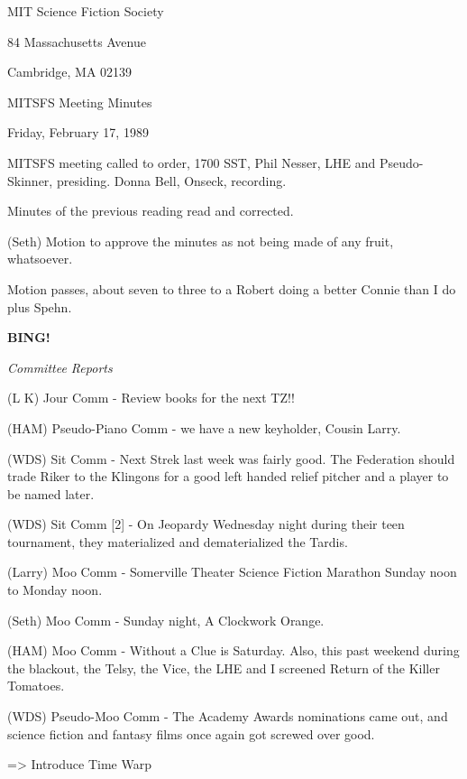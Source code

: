 \documentclass[12pt]{article}
\newcommand{\bing}{{\bf BING!} }
\newcommand{\goto}[1]{\bing \vskip 12pt \centerline{{\em{#1}}}}
\begin{document}
\begin{center}

MIT Science Fiction Society 

84 Massachusetts Avenue

Cambridge, MA 02139

\vspace{12pt}

MITSFS Meeting Minutes 

Friday, February 17, 1989

\end{center}
 
\vspace{18pt}

\setlength{\parskip}{6pt}

\noindent
MITSFS meeting called to order, 1700 SST, Phil Nesser, LHE and Pseudo-Skinner, presiding. Donna Bell, Onseck, recording.

Minutes of the previous reading read and corrected.

(Seth) Motion to approve the minutes as not being made of any fruit, whatsoever.

Motion passes, about seven to three to a Robert doing a better Connie than I do plus Spehn.

\goto{Committee Reports}

(L K) Jour Comm - Review books for the next TZ!!

(HAM) Pseudo-Piano Comm - we have a new keyholder, Cousin Larry.

(WDS) Sit Comm - Next Strek last week was fairly good.  The Federation should trade Riker to the Klingons for a good left handed relief pitcher and a player to be named later.

(WDS) Sit Comm [2] - On Jeopardy Wednesday night during their teen tournament, they materialized and dematerialized the Tardis.

(Larry) Moo Comm - Somerville Theater Science Fiction Marathon Sunday noon to Monday noon.

(Seth) Moo Comm - Sunday night, A Clockwork Orange.

(HAM) Moo Comm - Without a Clue is Saturday. Also, this past weekend during the blackout, the Telsy, the Vice, the LHE and I screened Return of the Killer Tomatoes.

(WDS) Pseudo-Moo Comm - The Academy Awards nominations came out, and science fiction and fantasy films once again got screwed over good. 

=> Introduce Time Warp
\end{document}
